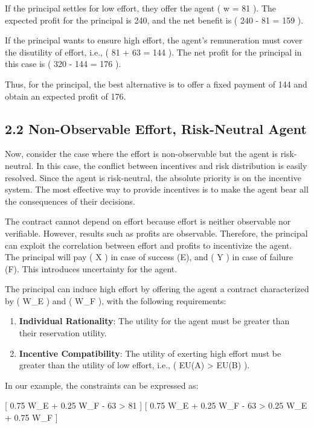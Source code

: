 \documentclass[
  letterpaper,
  DIV=11,
  numbers=noendperiod]{scrartcl}
\providecommand{\tightlist}{%
  \setlength{\itemsep}{0pt}\setlength{\parskip}{0pt}}\usepackage{longtable,booktabs,array}
\begin{document}
If the principal settles for low effort, they offer the agent ( w = 81
). The expected profit for the principal is 240, and the net benefit is
( 240 - 81 = 159 ).

If the principal wants to ensure high effort, the agent's remuneration
must cover the disutility of effort, i.e., ( 81 + 63 = 144 ). The net
profit for the principal in this case is ( 320 - 144 = 176 ).

Thus, for the principal, the best alternative is to offer a fixed
payment of 144 and obtain an expected profit of 176.

\subsection{2.2 Non-Observable Effort, Risk-Neutral
Agent}\label{non-observable-effort-risk-neutral-agent}

Now, consider the case where the effort is non-observable but the agent
is risk-neutral. In this case, the conflict between incentives and risk
distribution is easily resolved. Since the agent is risk-neutral, the
absolute priority is on the incentive system. The most effective way to
provide incentives is to make the agent bear all the consequences of
their decisions.

The contract cannot depend on effort because effort is neither
observable nor verifiable. However, results such as profits are
observable. Therefore, the principal can exploit the correlation between
effort and profits to incentivize the agent. The principal will pay ( X
) in case of success (E), and ( Y ) in case of failure (F). This
introduces uncertainty for the agent.

The principal can induce high effort by offering the agent a contract
characterized by ( W\_E ) and ( W\_F ), with the following requirements:

\begin{enumerate}
\def\labelenumi{\arabic{enumi}.}
\tightlist
\item
  \textbf{Individual Rationality}: The utility for the agent must be
  greater than their reservation utility.
\item
  \textbf{Incentive Compatibility}: The utility of exerting high effort
  must be greater than the utility of low effort, i.e., ( EU(A)
  \textgreater{} EU(B) ).
\end{enumerate}

In our example, the constraints can be expressed as:

{[} 0.75 W\_E + 0.25 W\_F - 63 \textgreater{} 81 {]} {[} 0.75 W\_E +
0.25 W\_F - 63 \textgreater{} 0.25 W\_E + 0.75 W\_F {]}
\end{document}
